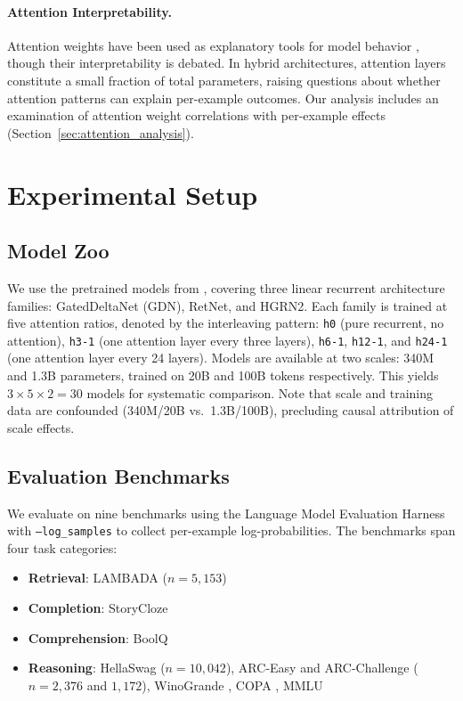 \documentclass[11pt,a4paper]{article}
\begin{document}
\paragraph{Attention Interpretability.}
Attention weights have been used as explanatory tools for model behavior \citep{jain2019attention, wiegreffe2019attention}, though their interpretability is debated. In hybrid architectures, attention layers constitute a small fraction of total parameters, raising questions about whether attention patterns can explain per-example outcomes. Our analysis includes an examination of attention weight correlations with per-example effects (Section~\ref{sec:attention_analysis}).

\section{Experimental Setup}
\label{sec:setup}

\subsection{Model Zoo}

We use the pretrained models from \citet{wang2025mamba}, covering three linear recurrent architecture families: GatedDeltaNet (GDN), RetNet, and HGRN2. Each family is trained at five attention ratios, denoted by the interleaving pattern: \texttt{h0} (pure recurrent, no attention), \texttt{h3-1} (one attention layer every three layers), \texttt{h6-1}, \texttt{h12-1}, and \texttt{h24-1} (one attention layer every 24 layers). Models are available at two scales: 340M and 1.3B parameters, trained on 20B and 100B tokens respectively. This yields $3 \times 5 \times 2 = 30$ models for systematic comparison. Note that scale and training data are confounded (340M/20B vs.\ 1.3B/100B), precluding causal attribution of scale effects.

\subsection{Evaluation Benchmarks}

We evaluate on nine benchmarks using the Language Model Evaluation Harness \citep{gao2023framework} with \texttt{--log\_samples} to collect per-example log-probabilities. The benchmarks span four task categories:
\begin{itemize}
\item \textbf{Retrieval}: LAMBADA \citep{paperno2016lambada} ($n = 5{,}153$)
\item \textbf{Completion}: StoryCloze \citep{mostafazadeh2016corpus}
\item \textbf{Comprehension}: BoolQ \citep{clark2019boolq}
\item \textbf{Reasoning}: HellaSwag \citep{zellers2019hellaswag} ($n = 10{,}042$), ARC-Easy and ARC-Challenge \citep{clark2018think} ($n = 2{,}376$ and $1{,}172$), WinoGrande \citep{sakaguchi2020winogrande}, COPA \citep{roemmele2011choice}, MMLU \citep{hendrycks2021measuring}
\end{itemize}
\end{document}
